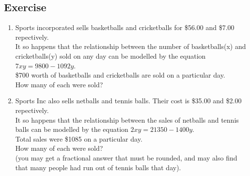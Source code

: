 \documentclass[a4paper,11pt]{article}
\begin{document}
\subsection{Exercise} \label{ex8}
\begin{enumerate}
\item Sports incorporated sells basketballs and cricketballs for \$56.00 and \$7.00 repectively.\\
It so happens that the relationship between the number of basketballs(x) and cricketballs(y) sold on any day can be modelled by the equation $7xy=9800-1092y$.\\
\$700 worth of basketballs and cricketballs are sold on a particular day.\\
How many of each were sold?
\item Sports Inc also sells netballs and tennis balls. Their cost is \$35.00 and \$2.00 repectively.\\
It so happens that the relationship between the sales of netballs and tennis balls can be modelled by the equation $2xy=21350-1400y$.\\
Total sales were \$1085 on a particular day.\\
How many of each were sold?\\
(you may get a fractional answer that must be rounded, and may also find that many people had run out of tennis balls that day).
	
\end{enumerate}
\newpage
\end{document}
